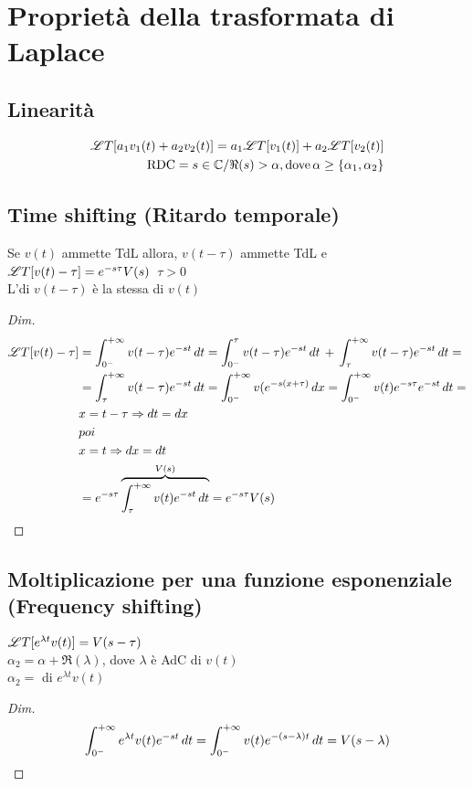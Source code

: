 \section{Proprietà della trasformata di Laplace}
\subsection{Linearità}
\[
   \begin{split}
      \mathscr{L}T[a_1v_1(t) + a_2v_2(t)] = a_1\mathscr{L}T[v_1(t)] + a_2\mathscr{L}T[v_2(t)]\\
      \mathrm{RDC} = {s\in\mathbb{C} / \Re(s)>\alpha}\mathrm{, dove}\,\alpha\ge\{\alpha_1, \alpha_2\}
   \end{split}
\]
\subsection{Time shifting (Ritardo temporale)}
Se $v(t)$ ammette TdL allora, $v(t - \tau)$ ammette TdL e $\mathscr{L}T[v(t) - \tau] = e^{-s\tau}V(s)$\, $\tau>0$\\
L'\AdC di $v(t - \tau)$ è la stessa di $v(t)$
\begin{proof}[Dim]
   \[
      \begin{split}
         \LA[v(t) - \tau] & = \intZeroInfinity v(t - \tau)e^{-st}\,dt = \int_{0^-}^\tau v(t - \tau)e^{-st}\,dt\,+\,\int_\tau^{+\infty}v(t - \tau)e^{-st}\,dt =\\
         & = \int_\tau^{+\infty}v(t - \tau)e^{-st}\,dt = \intZeroInfinity v(e^{-s(x + \tau)}\,dx = \intZeroInfinity v(t)e^{-s\tau}e^{-st}\,dt =\\
         & x = t - \tau \Rightarrow dt = dx \\
         & poi \\ %
         & x = t \Rightarrow dx = dt\\
         & = e^{-s\tau}\overbrace{\int_\tau^{+\infty}v(t)e^{-st}\,dt}^{V(s)} = e^{-s\tau}V(s)
      \end{split}
   \]
\end{proof}
\subsection{Moltiplicazione per una funzione esponenziale (Frequency shifting)}
   $\mathscr{L}T[e^{\lambda t}v(t)] = V(s - \tau)$\\
   $\alpha_2 = \alpha + \Re(\lambda)$, dove $\lambda$ è AdC di $v(t)$\\
   $\alpha_2 = $ \AdC di $e^{\lambda t}v(t)$
\begin{proof}[Dim]
   \[
      \int_{0^-}^{+\infty} e^{\lambda t}v(t)e^{-st}\,dt = \int_{0^-}^{+\infty} v(t)e^{-(s - \lambda)t}\,dt = V(s - \lambda)
   \]
\end{proof}
